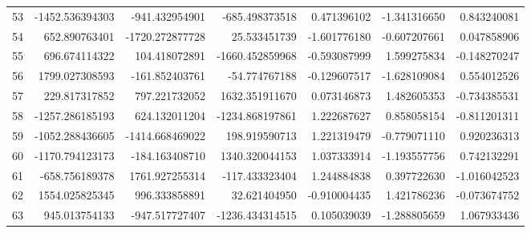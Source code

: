\begin{longtable}{rrrrrrr}
53 & -1452.536394303 & -941.432954901 & -685.498373518 & 0.471396102 & -1.341316650 & 0.843240081 \\
54 & 652.890763401 & -1720.272877728 & 25.533451739 & -1.601776180 & -0.607207661 & 0.047858906 \\
55 & 696.674114322 & 104.418072891 & -1660.452859968 & -0.593087999 & 1.599275834 & -0.148270247 \\
56 & 1799.027308593 & -161.852403761 & -54.774767188 & -0.129607517 & -1.628109084 & 0.554012526 \\
57 & 229.817317852 & 797.221732052 & 1632.351911670 & 0.073146873 & 1.482605353 & -0.734385531 \\
58 & -1257.286185193 & 624.132011204 & -1234.868197861 & 1.222687627 & 0.858058154 & -0.811201311 \\
59 & -1052.288436605 & -1414.668469022 & 198.919590713 & 1.221319479 & -0.779071110 & 0.920236313 \\
60 & -1170.794123173 & -184.163408710 & 1340.320044153 & 1.037333914 & -1.193557756 & 0.742132291 \\
61 & -658.756189378 & 1761.927255314 & -117.433323404 & 1.244884838 & 0.397722630 & -1.016042523 \\
62 & 1554.025825345 & 996.333858891 & 32.621404950 & -0.910004435 & 1.421786236 & -0.073674752 \\
63 & 945.013754133 & -947.517727407 & -1236.434314515 & 0.105039039 & -1.288805659 & 1.067933436 \\
\bottomrule
\end{longtable}
